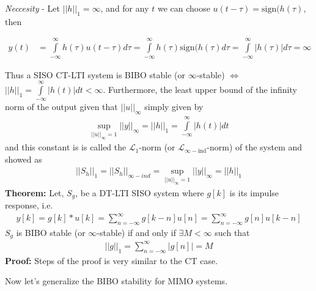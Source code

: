 \documentclass[twoside]{article}
\begin{document}
\textit{Neccesity} - Let $ || h ||_1 = \infty $, and for any $t$ we can choose $u(t - \tau) = \mathrm{sign}( h( \tau )$, then

\begin{align*}
	y(t) &= \int\limits_{-\infty}^{\infty} h(\tau) u(t - \tau) d\tau = 
	\int\limits_{-\infty}^{\infty} h(\tau) \mathrm{sign}( h( \tau ) d\tau = 
	\int\limits_{-\infty}^{\infty} | h(\tau) |  d\tau = \infty
\end{align*}

Thus a SISO CT-LTI system is  BIBO stable (or $\infty$-stable) $\iff$ $|| h ||_{1} = \int\limits_{-\infty}^{\infty} | h(t) | dt < \infty$.
Furthermore, the least upper bound of the infinity norm of the output given that $ || u ||_{\infty}$ simply given by 
%
\begin{align*}
	\underset{|| u ||_{\infty} = 1}{\sup} || y ||_{\infty} = || h ||_{1} = \int\limits_{-\infty}^{\infty} | h(t) | dt
\end{align*}
%
and this constant is is called the $\mathcal{L}_1$-norm (or $\mathcal{L}_{\infty-\mathrm{ind}}$-norm) of the system and showed as
%
\begin{align*}
	|| S_h ||_1 = || S_h ||_{\infty-ind} =  \underset{|| u ||_{\infty} = 1}{\sup} || y ||_{\infty} = || h ||_{1} 
\end{align*}
%
\textbf{Theorem:} Let, $S_{g}$, be a DT-LTI SISO system where $g[k]$ is its impulse response, i.e.
%
\begin{align*}
y[k] = g[k] * u[k] = \sum\limits_{n=-\infty}^{\infty} g[k - n] u[n]  =  \sum\limits_{n=-\infty}^{\infty} g[n] u[k - n]  
\end{align*}
%
$S_{g}$ is BIBO stable (or $\infty$-stable) if and only if $\exists M < \infty$ such that 
%
\begin{align*}
	|| g ||_1 =  \sum\limits_{n=-\infty}^{\infty} | g[n] | = M
\end{align*}
%
\textbf{Proof:} Steps of the proof is very similar to the CT case. 

Now let's generalize the BIBO stability for MIMO systems. 
\end{document}
